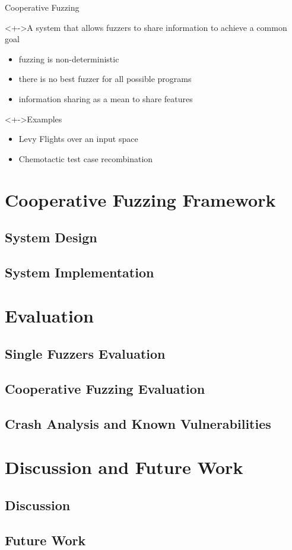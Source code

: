 \documentclass[handout]{beamer}
\begin{document}
\begin{frame}{Cooperative Fuzzing}
    \begin{block}<+->{A system that allows fuzzers to share information to achieve a common goal}
        \begin{itemize}[<+->]
            \item{} fuzzing is non-deterministic
            \item{} there is no best fuzzer for all possible programs
            \item{} information sharing as a mean to share features
        \end{itemize}
    \end{block}
    \begin{exampleblock}<+->{Examples}
        \begin{itemize}
            \item{} Levy Flights over an input space
            \item{} Chemotactic test case recombination
        \end{itemize}
    \end{exampleblock}
\end{frame}

\section{Cooperative Fuzzing Framework}

\subsection{System Design}

\subsection{System Implementation}

\section{Evaluation}

\subsection{Single Fuzzers Evaluation}

\subsection{Cooperative Fuzzing Evaluation}

\subsection{Crash Analysis and Known Vulnerabilities}

\section{Discussion and Future Work}

\subsection*{Discussion}

\subsection*{Future Work}
\end{document}
